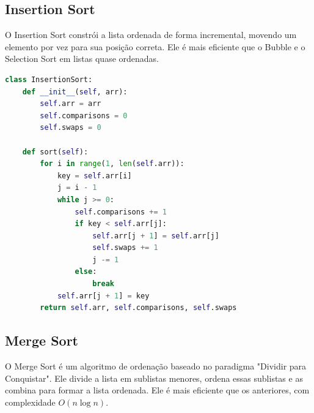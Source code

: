 \documentclass[tcc1,project]{uftex}
\begin{document}
\subsection{Insertion Sort}
O Insertion Sort constrói a lista ordenada de forma incremental, movendo um elemento por vez para sua posição correta. Ele é mais eficiente que o Bubble e o Selection Sort em listas quase ordenadas.

\begin{lstlisting}[language=Python, caption=InsertionSort]
class InsertionSort:
    def __init__(self, arr):
        self.arr = arr
        self.comparisons = 0
        self.swaps = 0

    def sort(self):
        for i in range(1, len(self.arr)):
            key = self.arr[i]
            j = i - 1
            while j >= 0:
                self.comparisons += 1
                if key < self.arr[j]:
                    self.arr[j + 1] = self.arr[j]
                    self.swaps += 1
                    j -= 1
                else:
                    break
            self.arr[j + 1] = key
        return self.arr, self.comparisons, self.swaps
\end{lstlisting}

\subsection{Merge Sort}
O Merge Sort é um algoritmo de ordenação baseado no paradigma "Dividir para Conquistar". Ele divide a lista em sublistas menores, ordena essas sublistas e as combina para formar a lista ordenada. Ele é mais eficiente que os anteriores, com complexidade $O(n \log n)$.
\end{document}

